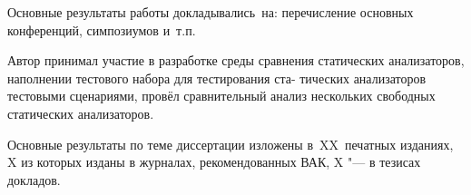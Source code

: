 {\probation}
Основные результаты работы докладывались~на:
перечисление основных конференций, симпозиумов и~т.\:п.

{\contribution} Автор принимал участие в разработке среды сравнения
статических анализаторов, наполнении тестового набора для тестирования ста-
тических анализаторов тестовыми сценариями, провёл сравнительный анализ
нескольких свободных статических анализаторов.

{%
    {\publications} Основные результаты по теме диссертации изложены
    в~XX~печатных изданиях,
    X из которых изданы в журналах, рекомендованных ВАК,
    X "--- в тезисах докладов.
}%


